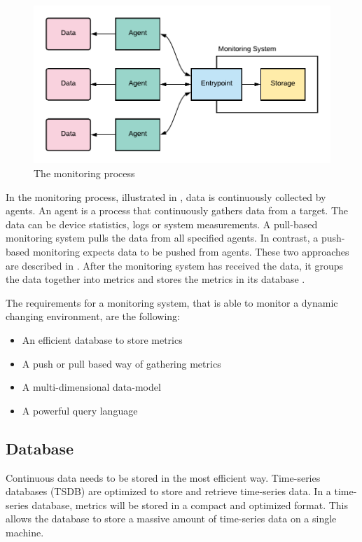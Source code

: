 \begin{figure}[h]
\centering
\includegraphics[scale=0.9]{images/02_theoretical_foundation/monitoring/monitoring_system}
\caption{The monitoring process}
\label{fig:mon_mon-system-process}
\end{figure}
In the monitoring process, illustrated in , data is continuously collected by agents. An agent is a process that continuously gathers data from a target. The data can be device statistics, logs or system measurements. A pull-based monitoring system pulls the data from all specified agents. In contrast, a push-based monitoring expects data to be pushed from agents. These two approaches are described in . After the monitoring system has received the data, it groups the data together into metrics and stores the metrics in its database \cite{Ligus2012EffMonitoring}.


The requirements for a monitoring system, that is able to monitor a dynamic changing environment, are the following:
\begin{itemize}
\item An efficient database to store metrics \cite{Farcic2017Toolkit21}
\item A push or pull based way of gathering metrics \cite{Farcic2017Toolkit21}
\item A multi-dimensional data-model \cite{Farcic2017Toolkit21}
\item A powerful query language \cite{Farcic2017Toolkit21}
\end{itemize}


\subsection{Database}
Continuous data needs to be stored in the most efficient way.
Time-series databases (TSDB) are optimized to store and retrieve time-series data.
In a time-series database, metrics will be stored in a compact and optimized format. This allows the database to store a massive amount of time-series data on a single machine.


